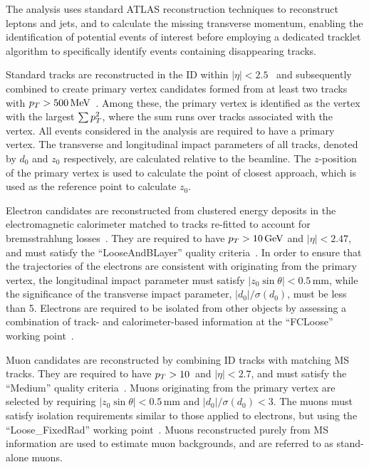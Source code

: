 The analysis uses standard ATLAS reconstruction techniques to reconstruct leptons and jets, and to calculate the missing transverse momentum, enabling the identification of potential events of interest before employing a dedicated tracklet algorithm to specifically identify events containing disappearing tracks.

Standard tracks are reconstructed in the ID within $|\eta| < 2.5$~\cite{PERF-2015-08} and subsequently combined to create primary vertex candidates formed from at least two tracks with $p_T> 500\,\text{MeV}$~\cite{ATL-PHYS-PUB-2015-026}. Among these, the primary vertex is identified as the vertex with the largest $\sum{\pt^2}$, where the sum runs over tracks associated with the vertex. All events considered in the analysis are required to have a primary vertex. The transverse and longitudinal impact parameters of all tracks, denoted by $d_0$ and $z_0$ respectively, are calculated relative to the beamline. The $z$-position of the primary vertex is used to calculate the point of closest approach, which is used as the reference point to calculate $z_0$.

Electron candidates are reconstructed from clustered energy deposits in the electromagnetic calorimeter matched to tracks re-fitted to account for bremsstrahlung losses~\cite{EGAM-2018-01}. They are required to have $p_T > 10\,\text{GeV}$ and $|\eta| < 2.47$, and must satisfy the \enquote{LooseAndBLayer} quality criteria~\cite{PERF-2017-01}. In order to ensure that the trajectories of the electrons are consistent with originating from the primary vertex, the longitudinal impact parameter must satisfy $|z_0\sin\theta| < 0.5\,$mm, while the significance of the transverse impact parameter, $|d_0|/\sigma(d_0)$, must be less than 5. Electrons are required to be isolated from other objects by assessing a combination of track- and calorimeter-based information at the \enquote{FCLoose} working point~\cite{EGAM-2021-01}.

Muon candidates are reconstructed by combining ID tracks with matching MS tracks. They are required to have $p_T > 10$~\GeV and $|\eta| < 2.7$, and must satisfy the \enquote{Medium} quality criteria~\cite{MUON-2018-03}. Muons originating from the primary vertex are selected by requiring $|z_0\sin\theta| < 0.5\,$mm and $|d_0|/\sigma(d_0) < 3$. The muons must satisfy isolation requirements similar to those applied to electrons, but using the \enquote{Loose\_FixedRad} working point~\cite{MUON-2022-01}. Muons reconstructed purely from MS information are used to estimate muon backgrounds, and are referred to as stand-alone muons.

